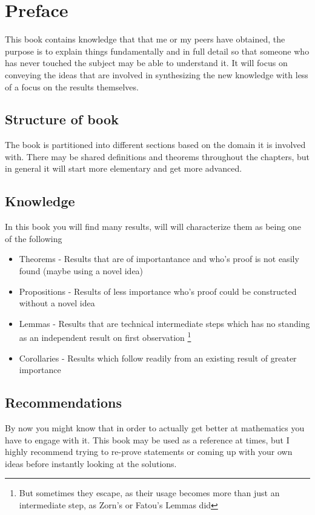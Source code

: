 \chapter*{Preface}
This book contains knowledge that that me or my peers have obtained, the purpose is to explain things fundamentally and in full detail so that someone who has never touched the subject may be able to understand it. It will focus on conveying the ideas that are involved in synthesizing the new knowledge with less of a focus on the results themselves.


\section*{Structure of book}
The book is partitioned into different sections based on the domain it is involved with. There may be shared definitions and theorems throughout the chapters, but in general it will start more elementary and get more advanced.

\section*{Knowledge}
In this book you will find many results, will will characterize them as being one of the following
\begin{itemize}
    \item Theorems - Results that are of importantance and who's proof is not easily found (maybe using a novel idea)
  \item Propositions - Results of less importance who's proof could be constructed without a novel idea
  \item Lemmas - Results that are technical intermediate steps which has no standing as an independent result on first observation \footnote[2]{But sometimes they escape, as their usage becomes more than just an intermediate step,  as Zorn's or Fatou's Lemmas did}
    \item Corollaries - Results which follow readily  from an existing result of greater importance
\end{itemize}

\section*{Recommendations}
By now you might know that in order to actually get better at mathematics you have to engage with it. This book may be used as a reference at times, but I highly recommend trying to re-prove statements or coming up with your own ideas before instantly looking at the solutions.


